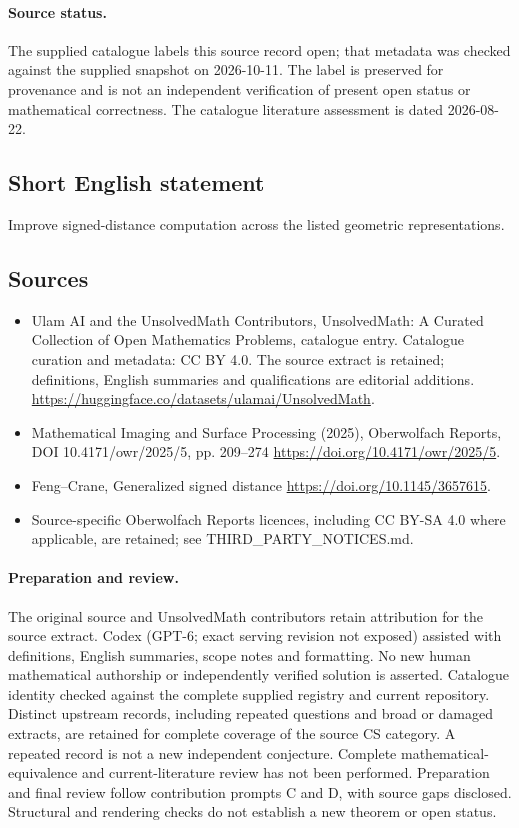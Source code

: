 \documentclass[11pt]{article}
\begin{document}
\paragraph{Source status.}
The supplied catalogue labels this source record open; that metadata was checked against the supplied snapshot on 2026-10-11. The label is preserved for provenance and is not an independent verification of present open status or mathematical correctness. The catalogue literature assessment is dated 2026-08-22.
\subsection{Short English statement}
Improve signed-distance computation across the listed geometric representations.
\subsection{Sources}
\begin{itemize}
\item[S1] Ulam AI and the UnsolvedMath Contributors, UnsolvedMath: A Curated Collection of Open Mathematics Problems, catalogue entry. Catalogue curation and metadata: CC BY 4.0. The source extract is retained; definitions, English summaries and qualifications are editorial additions.
\url{https://huggingface.co/datasets/ulamai/UnsolvedMath}.
\item[S2] Mathematical Imaging and Surface Processing (2025), Oberwolfach Reports, DOI 10.4171/owr/2025/5, pp. 209--274
\url{https://doi.org/10.4171/owr/2025/5}.
\item[S3] Feng--Crane, Generalized signed distance
\url{https://doi.org/10.1145/3657615}.
\item Source-specific Oberwolfach Reports licences, including CC BY-SA 4.0 where applicable, are retained; see THIRD\_PARTY\_NOTICES.md.
\end{itemize}
\paragraph{Preparation and review.}
The original source and UnsolvedMath contributors retain attribution for the source extract. Codex (GPT-6; exact serving revision not exposed) assisted with definitions, English summaries, scope notes and formatting. No new human mathematical authorship or independently verified solution is asserted. Catalogue identity checked against the complete supplied registry and current repository. Distinct upstream records, including repeated questions and broad or damaged extracts, are retained for complete coverage of the source CS category. A repeated record is not a new independent conjecture. Complete mathematical-equivalence and current-literature review has not been performed. Preparation and final review follow contribution prompts C and D, with source gaps disclosed. Structural and rendering checks do not establish a new theorem or open status.
\label{end:statement}
\end{document}
